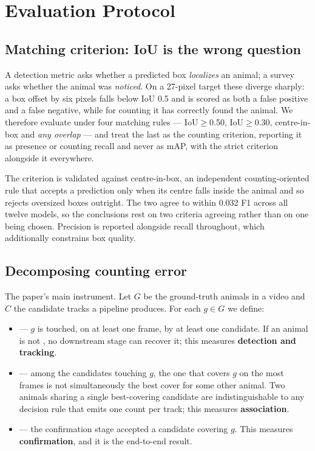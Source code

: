 \section{Evaluation Protocol}
\label{sec:protocol}

\subsection{Matching criterion: IoU is the wrong question}
\label{sec:criterion}

A detection metric asks whether a predicted box \emph{localizes} an animal; a survey asks
whether the animal was \emph{noticed}. On a 27-pixel target these diverge sharply: a box
offset by six pixels falls below IoU 0.5 and is scored as both a false positive and a false
negative, while for counting it has correctly found the animal. We therefore evaluate under
four matching rules --- IoU$\geq$0.50, IoU$\geq$0.30, centre-in-box and \emph{any overlap} ---
and treat the last as the counting criterion, reporting it as presence or counting recall
and never as mAP, with the strict criterion alongside it everywhere.

The criterion is validated against centre-in-box, an independent counting-oriented rule that
accepts a prediction only when its centre falls inside the animal and so rejects oversized
boxes outright. The two agree to within 0.032 F1 across all twelve models, so the
conclusions rest on two criteria agreeing rather than on one being chosen. Precision is
reported alongside recall throughout, which additionally constrains box quality.

\subsection{Decomposing counting error}
\label{sec:decomposition}

The paper's main instrument. Let $G$ be the ground-truth animals in a video and $C$ the
candidate tracks a pipeline produces. For each $g\in G$ we define:

\begin{itemize}\itemsep2pt \parskip0pt
\item \reachedq --- $g$ is touched, on at least one frame, by at least one candidate. If
an animal is not \reachedq, no downstream stage can recover it; this measures
\textbf{detection and tracking}.
\item \primaryq --- among the candidates touching $g$, the one that covers $g$ on the most
frames is not simultaneously the best cover for some other animal. Two animals sharing a
single best-covering candidate are indistinguishable to any decision rule that emits one
count per track; this measures \textbf{association}.
\item \countedq --- the confirmation stage accepted a candidate covering $g$. This measures
\textbf{confirmation}, and it is the end-to-end result.
\end{itemize}


